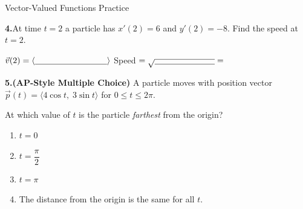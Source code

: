 \documentclass[10pt]{article}
\begin{document}
\begin{notesbox}{Vector-Valued Functions Practice}
\vspace{0.14in}

\textbf{4.}\quad At time $t=2$ a particle has $x'(2)=6$ and $y'(2)=-8$.
Find the speed at $t=2$.

\vspace{0.06in}
\hspace{1em} $\vec{v}(2) = \langle \blank{3cm}\rangle$ \qquad
Speed $= \sqrt{\blank{2.5cm}} = $ \blank{3cm}

\vspace{0.14in}

\textbf{5.}\quad \textbf{(AP-Style Multiple Choice)}\quad
A particle moves with position vector
$\vec{p}(t)=\langle 4\cos t,\;3\sin t\rangle$ for $0\le t\le 2\pi$.

At which value of $t$ is the particle \emph{farthest} from the origin?

\begin{enumerate}[label=(\Alph*)]
  \item $t=0$
  \item $t=\dfrac{\pi}{2}$
  \item $t=\pi$
  \item The distance from the origin is the same for all $t$.
\end{enumerate}

\end{notesbox}
\end{document}
